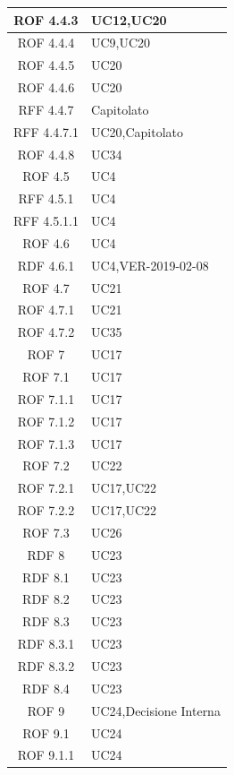 \begin{center}
\begin{longtable}[c]{|c|m{}|}
\hline
ROF 4.4.3 & UC12,UC20 \\
\hline
\rowcolor{grigio}ROF 4.4.4 & UC9,UC20 \\
\hline
ROF 4.4.5 & UC20 \\
\hline
\rowcolor{grigio}ROF 4.4.6 & UC20 \\
\hline
RFF 4.4.7 & Capitolato \\
\hline
\rowcolor{grigio}RFF 4.4.7.1 & UC20,Capitolato \\
\hline
ROF 4.4.8 & UC34 \\
\hline
\rowcolor{grigio}ROF 4.5 & UC4 \\
\hline
RFF 4.5.1 & UC4 \\
\hline
\rowcolor{grigio}RFF 4.5.1.1 & UC4 \\
\hline
ROF 4.6 & UC4 \\
\hline
\rowcolor{grigio}RDF 4.6.1 & UC4,VER-2019-02-08 \\
\hline
ROF 4.7 & UC21 \\
\hline
\rowcolor{grigio}ROF 4.7.1 & UC21 \\
\hline
ROF 4.7.2 & UC35 \\
\hline
\rowcolor{grigio}ROF 7 & UC17 \\
\hline
ROF 7.1 & UC17 \\
\hline
\rowcolor{grigio}ROF 7.1.1 & UC17 \\
\hline
ROF 7.1.2 & UC17 \\
\hline
\rowcolor{grigio}ROF 7.1.3 & UC17 \\
\hline
ROF 7.2 & UC22 \\
\hline
\rowcolor{grigio}ROF 7.2.1 & UC17,UC22 \\
\hline
ROF 7.2.2 & UC17,UC22 \\
\hline
\rowcolor{grigio}ROF 7.3 & UC26 \\
\hline
RDF 8 & UC23 \\
\hline
\rowcolor{grigio}RDF 8.1 & UC23 \\
\hline
RDF 8.2 & UC23 \\
\hline
\rowcolor{grigio}RDF 8.3 & UC23 \\
\hline
RDF 8.3.1 & UC23 \\
\hline
\rowcolor{grigio}RDF 8.3.2 & UC23 \\
\hline
RDF 8.4 & UC23 \\
\hline
\rowcolor{grigio}ROF 9 & UC24,Decisione Interna \\
\hline
ROF 9.1 & UC24 \\
\hline
\rowcolor{grigio}ROF 9.1.1 & UC24 \\

\end{longtable}
\end{center}

